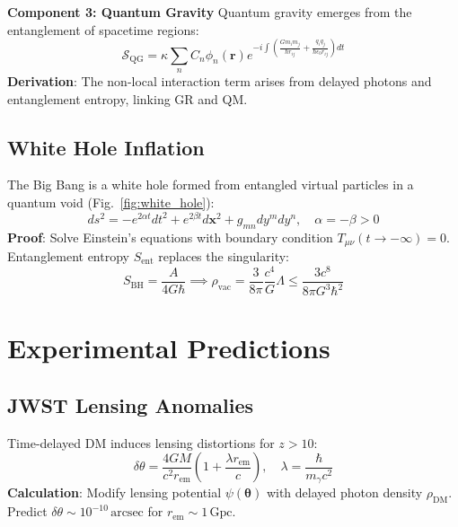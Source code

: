 \documentclass[12pt, a4paper]{article}
\begin{document}
\textbf{Component 3: Quantum Gravity}
Quantum gravity emerges from the entanglement of spacetime regions:
\begin{equation}
\mathcal{S}_{\text{QG}} = \kappa \sum_{n} C_n \phi_n(\bm{r}) e^{-i \int \left( \frac{G m_i m_j}{\hbar r_{ij}} + \frac{q_i q_j}{\hbar \epsilon_0 r_{ij}} \right) dt}
\label{eq:quantum_gravity}
\end{equation}
\textbf{Derivation}: The non-local interaction term arises from delayed photons and entanglement entropy, linking GR and QM.

\subsection{White Hole Inflation}
\label{subsec:inflation}
The Big Bang is a white hole formed from entangled virtual particles in a quantum void (Fig.~\ref{fig:white_hole}):
\begin{equation}
ds^2 = -e^{2\alpha t} dt^2 + e^{2\beta t} d\bm{x}^2 + g_{mn} dy^m dy^n, \quad \alpha = -\beta > 0
\label{eq:metric}
\end{equation}
\textbf{Proof}: Solve Einstein’s equations with boundary condition \( T_{\mu\nu}(t \to -\infty) = 0 \). Entanglement entropy \( S_{\text{ent}} \) replaces the singularity:
\begin{equation}
S_{\text{BH}} = \frac{A}{4G\hbar} \implies \rho_{\text{vac}} = \frac{3}{8\pi} \frac{c^4}{G} \Lambda \leq \frac{3c^8}{8\pi G^3 \hbar^2}
\label{eq:entropy_bound}
\end{equation}

\section{Experimental Predictions}
\label{sec:experiments}

\subsection{JWST Lensing Anomalies}
\label{subsec:lensing}
Time-delayed DM induces lensing distortions for \( z > 10 \):
\begin{equation}
\delta \theta = \frac{4GM}{c^2 r_{\text{em}}} \left(1 + \frac{\lambda r_{\text{em}}}{c}\right), \quad \lambda = \frac{\hbar}{m_\gamma c^2}
\label{eq:lensing}
\end{equation}
\textbf{Calculation}: Modify lensing potential \( \psi(\bm{\theta}) \) with delayed photon density \( \rho_{\text{DM}} \). Predict \( \delta \theta \sim 10^{-10} \, \text{arcsec} \) for \( r_{\text{em}} \sim 1 \, \text{Gpc} \).
\end{document}
